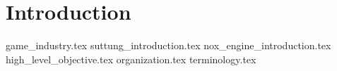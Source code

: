 \chapter{Introduction}
\label{chap:introduction}

{game_industry.tex}
{suttung_introduction.tex}
{nox_engine_introduction.tex}
{high_level_objective.tex}
{organization.tex}
{terminology.tex}
